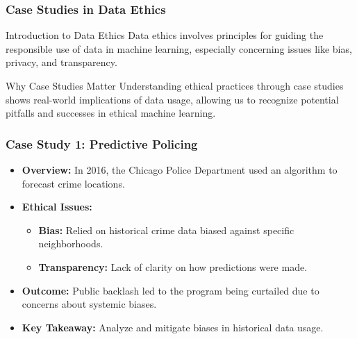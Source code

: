 \documentclass[aspectratio=169]{beamer}
\begin{document}
\begin{frame}[fragile]
    \frametitle{Case Studies in Data Ethics}
    \begin{block}{Introduction to Data Ethics}
        Data ethics involves principles for guiding the responsible use of data in machine learning, especially concerning issues like bias, privacy, and transparency.
    \end{block}
    
    \begin{block}{Why Case Studies Matter}
        Understanding ethical practices through case studies shows real-world implications of data usage, allowing us to recognize potential pitfalls and successes in ethical machine learning.
    \end{block}
\end{frame}

\begin{frame}[fragile]
    \frametitle{Case Study 1: Predictive Policing}
    \begin{itemize}
        \item \textbf{Overview:} In 2016, the Chicago Police Department used an algorithm to forecast crime locations.
        
        \item \textbf{Ethical Issues:}
            \begin{itemize}
                \item \textbf{Bias:} Relied on historical crime data biased against specific neighborhoods.
                \item \textbf{Transparency:} Lack of clarity on how predictions were made.
            \end{itemize}
        
        \item \textbf{Outcome:} Public backlash led to the program being curtailed due to concerns about systemic biases.
        
        \item \textbf{Key Takeaway:} Analyze and mitigate biases in historical data usage.
    \end{itemize}
\end{frame}
\end{document}
